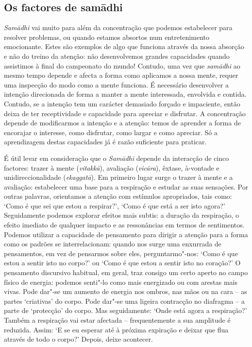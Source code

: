 \subsection{Os factores de samādhi}

\emph{Samādhi} vai muito para além da concentração que podemos estabelecer para
resolver problemas, ou quando estamos absortos num entretenimento emocionante.
Estes são exemplos de algo que funciona através da nossa absorção e não do
treino da atenção: não desenvolvemos grandes capacidades quando assistimos à
final do campeonato do mundo! Contudo, uma vez que \emph{samādhi} ao mesmo tempo
depende e afecta a forma como aplicamos a nossa mente, requer uma inspecção do
modo como a mente funciona. É necessário desenvolver a intenção direcionada de
forma a manter a mente interessada, envolvida e contida. Contudo, se a intenção
tem um carácter demasiado forçado e impaciente, então deixa de ter receptividade
e capacidade para apreciar e disfrutar. A concentração depende de modificarmos a
intenção e a atenção: temos de aprender a forma de encorajar o interesse, como
disfrutar, como largar e como apreciar. Só a aprendizagem destas capacidades já
é razão suficiente para praticar.

É útil levar em consideração que o \emph{Samādhi} depende da interacção de cinco
factores: trazer à mente (\emph{vitakkā}), avaliação (\emph{vicāra}), êxtase,
à-vontade e unidireccionalidade (\emph{ekaggatā}). Em primeiro lugar surge o
trazer à mente e a avaliação: estabelecer uma base para a respiração e estudar
as suas sensações. Por outras palavras, orientamos a atenção com estímulos
apropriados, tais como: `Como é que sei que estou a respirar?', `Como é que está
a ser isto agora?' Seguidamente podemos explorar efeitos mais subtis: a duração
da respiração, o efeito imediato de qualquer impacto e as ressonâncias em termos
de sentimentos. Podemos utilizar a capacidade de pensamento para dirigir a
atenção para a forma como os padrões se interrelacionam: quando nos surge uma
enxurrada de pensamentos, em vez de pensarmos sobre eles, perguntarmo"-nos: `Como
é que estou a sentir isto no corpo?' ou `Como é que estou a sentir isto no
coração?' O pensamento discursivo habitual, em geral, traz consigo um certo
aperto no campo físico de energia: podemos senti"-lo como mais energizado ou com
arestas mais vivas. Pode dar"-se um aumento de energia nos ombros, nas mãos ou na
cara -- as partes `criativas' do corpo. Pode dar"-se uma ligeira contracção no
diafragma -- a parte de `protecção' do corpo. Mas seguidamente: `Onde está agora
a respiração?' Também a respiração vai estar afectada -- frequentemente a sua
amplitude é reduzida. Assim: `E se eu esperar até à próxima expiração e deixar
que flua através de todo o corpo?' Depois, deixe acontecer.

